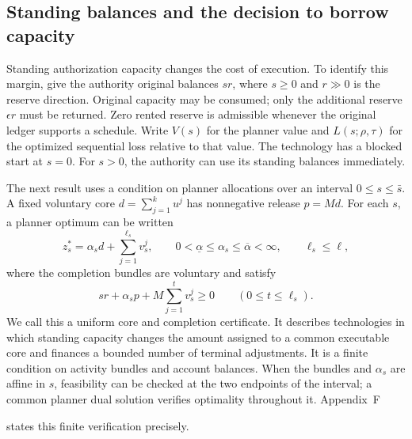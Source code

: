 \documentclass[ecta,draft]{econsocart}
\theoremstyle{definition}
\theoremstyle{definition}
\begin{document}
\subsection{Standing balances and the decision to borrow capacity}
\label{sec:standingcapacity}

Standing authorization capacity changes the cost of execution. To identify
this margin, give the authority original balances $s r$, where $s\geq0$
and $r\gg0$ is the reserve direction. Original capacity may be consumed;
only the additional reserve $\epsilon r$ must be returned. Zero rented
reserve is admissible whenever the original ledger supports a schedule. Write $V(s)$
for the planner value and $L(s;\rho,\tau)$ for the optimized sequential
loss relative to that value. The technology has a blocked start at
$s=0$. For $s>0$, the authority can use its standing balances immediately.

The next result uses a condition on planner allocations over an interval
$0\leq s\leq\bar s$. A fixed voluntary core $d=\sum_{j=1}^k u^j$
has nonnegative release $p=Md$. For each $s$, a planner optimum can be
written
\[
 z_s^*=\alpha_s d+\sum_{j=1}^{\ell_s}v_s^j,
 \qquad 0<\underline\alpha\leq\alpha_s\leq\overline\alpha<\infty,
 \qquad \ell_s\leq\ell,
\]
where the completion bundles are voluntary and satisfy
\[
 sr+\alpha_s p+M\sum_{j=1}^t v_s^j\geq0
 \qquad(0\leq t\leq\ell_s).
\]
We call this a uniform core and completion certificate. It describes
technologies in which standing capacity changes the amount assigned to
a common executable core and finances a bounded number of terminal
adjustments. It is a finite condition on activity bundles and account
balances. When the bundles and $\alpha_s$ are affine in $s$, feasibility
can be checked at the two endpoints of the interval; a common planner
dual solution verifies optimality throughout it. Appendix~F%

states this finite verification precisely.
\end{document}
